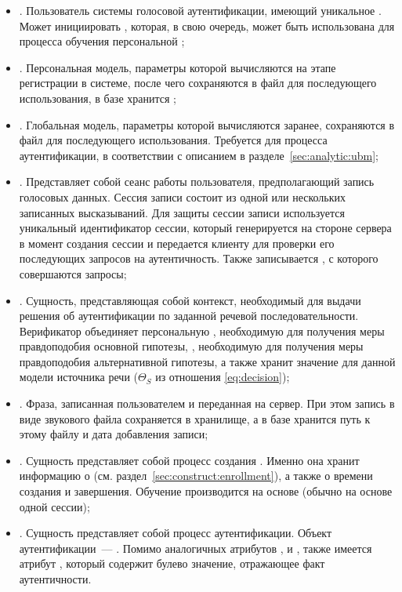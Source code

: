 \begin{itemize}
\item {}. Пользователь системы голосовой аутентификации, имеющий уникальное . Может инициировать , которая, в свою очередь, может быть использована для процесса обучения персональной ;
\item {}. Персональная модель, параметры которой вычисляются на этапе регистрации в системе, после чего сохраняются в файл для последующего использования, в базе хранится ;
\item {}. Глобальная модель, параметры которой вычисляются заранее, сохраняются в файл для последующего использования. Требуется для процесса аутентификации, в соответствии с описанием в разделе~\ref{sec:analytic:ubm};
\item {}. Представляет собой сеанс работы пользователя, предполагающий запись голосовых данных. Сессия записи состоит из одной или нескольких записанных высказываний. Для защиты сессии записи используется уникальный идентификатор сессии, который генерируется на стороне сервера в момент создания сессии и передается клиенту для проверки его последующих запросов на аутентичность. Также записывается , с которого совершаются запросы;
\item {}. Сущность, представляющая собой контекст, необходимый для выдачи решения об аутентификации по заданной речевой последовательности. Верификатор объединяет персональную , необходимую для получения меры правдоподобия основной гипотезы, , необходимую для получения меры правдоподобия альтернативной гипотезы, а также хранит значение  для данной модели источника речи ($\Theta_S$ из отношения \ref{eq:decision});
\item {}. Фраза, записанная пользователем и переданная на сервер. При этом запись в виде звукового файла сохраняется в хранилище, а в базе хранится путь к этому файлу и дата добавления записи;
\item {}. Сущность представляет собой процесс создания . Именно она хранит информацию о  (см. раздел~\ref{sec:construct:enrollment}), а также о времени создания и завершения. Обучение производится на основе  (обычно на основе одной сессии);
\item {}. Сущность представляет собой процесс аутентификации. Объект аутентификации~--- . Помимо аналогичных атрибутов ,  и , также имеется атрибут , который содержит булево значение, отражающее факт аутентичности.
\end{itemize}

